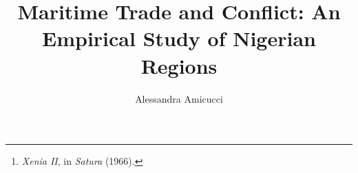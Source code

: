 \documentclass[a4paper, oneside]{sapthesis}
\title{Maritime Trade and Conflict: An Empirical Study of Nigerian Regions}
\author{Alessandra Amicucci}
\begin{document}
\frontmatter
\maketitle
\dedication{Ho sceso, dandoti il braccio, almeno un milione di scale\\
	e ora che non ci sei è il vuoto ad ogni gradino.\\ 
\hfill— Eugenio Montale\footnote{\textit{Xenia II}, in \textit{Satura} (1966).}}

\tableofcontents
\listoffigures
\listoftables


\mainmatter






\cleardoublepage
\appendix


\backmatter
\cleardoublepage
{}




\printbibliography



\end{document}

